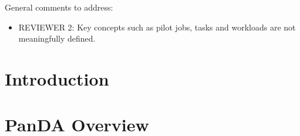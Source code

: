 \documentclass[conference]{IEEEtran}
\begin{document}
\ifreview
General comments to address:
\begin{itemize}
    \color{red} 
    \item REVIEWER 2:  Key concepts such as pilot jobs, tasks and workloads
    are not meaningfully defined.    %
\end{itemize}
\fi

\begin{abstract}

\end{abstract}


\section{Introduction}\label{sec:intro}



\section{PanDA Overview}\label{sec:panda_overview}

\end{document}
